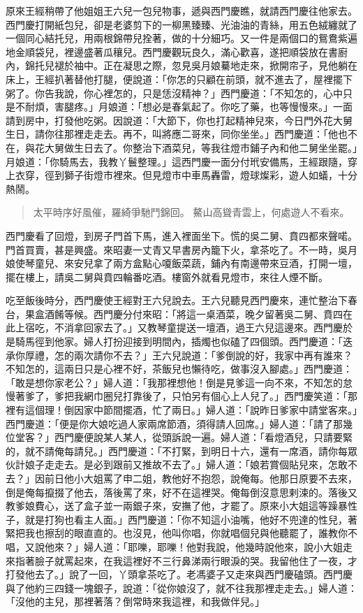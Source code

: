 原來王經稍帶了他姐姐王六兒一包兒物事，遞與西門慶瞧，就請西門慶往他家去。西門慶打開紙包兒，卻是老婆剪下的一柳黑臻臻、光油油的青絲，用五色絨纏就了一個同心結托兒，用兩根錦帶兒拴著，做的十分細巧。又一件是兩個口的鴛鴦紫遍地金順袋兒，裡邊盛著瓜穰兒。西門慶觀玩良久，滿心歡喜，遂把順袋放在書廚內，錦托兒褪於袖中。正在凝思之際，忽見吳月娘驀地走來，掀開帘子，見他躺在床上，王經扒著替他打腿，便說道：「你怎的只顧在前頭，就不進去了，屋裡擺下粥了。你告我說，你心裡怎的，只是恁沒精神？」西門慶道：「不知怎的，心中只是不耐煩，害腿疼。」月娘道：「想必是春氣起了。你吃了藥，也等慢慢來。」一面請到房中，打發他吃粥。因說道：「大節下，你也打起精神兒來，今日門外花大舅生日，請你往那裡走走去。再不，叫將應二哥來，同你坐坐。」西門慶道：「他也不在，與花大舅做生日去了。你整治下酒菜兒，等我往燈市鋪子內和他二舅坐坐罷。」月娘道：「你騎馬去，我教丫鬟整理。」這西門慶一面分付玳安備馬，王經跟隨，穿上衣穿，徑到獅子街燈市裡來。但見燈市中車馬轟雷，燈球燦彩，遊人如蟻，十分熱鬧。

\begin{quote}
太平時序好風催，羅綺爭馳鬥錦回。
鰲山高聳青雲上，何處遊人不看來。
\end{quote}

西門慶看了回燈，到房子門首下馬，進入裡面坐下。慌的吳二舅、賁四都來聲喏。門首買賣，甚是興盛。來昭妻一丈青又早書房內籠下火，拿茶吃了。不一時，吳月娘使琴童兒、來安兒拿了兩方盒點心嗄飯菜蔬，鋪內有南邊帶來豆酒，打開一壇，擺在樓上，請吳二舅與賁四輪番吃酒。樓窗外就看見燈市，來往人煙不斷。

吃至飯後時分，西門慶使王經對王六兒說去。王六兒聽見西門慶來，連忙整治下春台，果盒酒餚等候。西門慶分付來昭：「將這一桌酒菜，晚夕留著吳二舅、賁四在此上宿吃，不消拿回家去了。」又教琴童提送一壇酒，過王六兒這邊來。西門慶於是騎馬徑到他家。婦人打扮迎接到明間內，插燭也似磕了四個頭。西門慶道：「迭承你厚禮，怎的兩次請你不去？」王六兒說道：「爹倒說的好，我家中再有誰來？不知怎的，這兩日只是心裡不好，茶飯兒也懶待吃，做事沒入腳處。」西門慶道：「敢是想你家老公？」婦人道：「我那裡想他！倒是見爹這一向不來，不知怎的怠慢著爹了，爹把我網巾圈兒打靠後了，只怕另有個心上人兒了。」西門慶笑道：「那裡有這個理！倒因家中節間擺酒，忙了兩日。」婦人道：「說昨日爹家中請堂客來。」西門慶道：「便是你大娘吃過人家兩席節酒，須得請人回席。」婦人道：「請了那幾位堂客？」西門慶便說某人某人，從頭訴說一遍。婦人道：「看燈酒兒，只請要緊的，就不請俺每請兒。」西門慶道：「不打緊，到明日十六，還有一席酒，請你每眾伙計娘子走走去。是必到跟前又推故不去了。」婦人道：「娘若賞個貼兒來，怎敢不去？」因前日他小大姐罵了申二姐，教他好不抱怨，說俺每。他那日原要不去來，倒是俺每攛掇了他去，落後罵了來，好不在這裡哭。俺每倒沒意思剌涑的。落後又教爹娘費心，送了盒子並一兩銀子來，安撫了他，才罷了。原來小大姐這等躁暴性子，就是打狗也看主人面。」西門慶道：「你不知這小油嘴，他好不兜達的性兒，著緊把我也擦刮的眼直直的。也沒見，他叫你唱，你就唱個兒與他聽罷了，誰教你不唱，又說他來？」婦人道：「耶嚛，耶嚛！他對我說，他幾時說他來，說小大姐走來指著臉子就罵起來，在我這裡好不三行鼻涕兩行眼淚的哭。我留他住了一夜，才打發他去了。」說了一回，丫頭拿茶吃了。老馮婆子又走來與西門慶磕頭。西門慶與了他約三四錢一塊銀子，說道：「從你娘沒了，就不往我那裡走走去。」婦人道：「沒他的主兒，那裡著落？倒常時來我這裡，和我做伴兒。」


